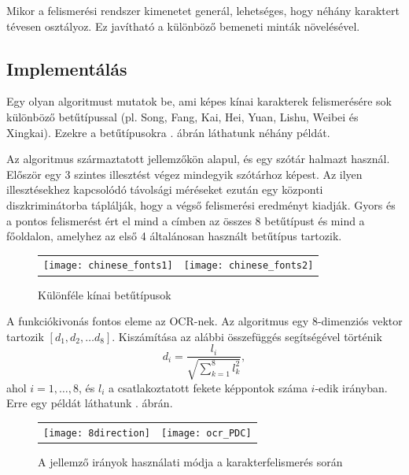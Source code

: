Mikor a felismerési rendszer kimenetet generál, lehetséges, hogy néhány karaktert tévesen osztályoz. Ez javítható a különböző bemeneti minták növelésével.

\subsection{Implementálás}

Egy olyan algoritmust mutatok be, ami képes kínai karakterek felismerésére sok különböző betűtípussal (pl. Song, Fang, Kai, Hei, Yuan, Lishu, Weibei és Xingkai). Ezekre a betűtípusokra . ábrán láthatunk néhány példát.

Az algoritmus származtatott jellemzőkön alapul, és egy szótár halmazt használ. Először egy 3 szintes illesztést végez mindegyik szótárhoz képest. Az ilyen illesztésekhez kapcsolódó távolsági méréseket ezután egy központi diszkriminátorba táplálják, hogy a végső felismerési eredményt kiadják. Gyors és a pontos felismerést ért el mind a címben az összes 8 betűtípust és mind a főoldalon, amelyhez az első 4 általánosan használt betűtípus tartozik.

\begin{figure}
\centering
\begin{tabular}{ c c }
\texttt{[image: chinese\_fonts1]} & \texttt{[image: chinese\_fonts2]}
\end{tabular}
\caption{Különféle kínai betűtípusok}
\label{fig:chinese_fonts}
\end{figure}

A funkciókivonás fontos eleme az OCR-nek. Az algoritmus egy 8-dimenziós vektor tartozik $[d_1, d_2, \ldots d_8]$. Kiszámítása az alábbi összefüggés segítségével történik
$$
d_i = \dfrac{l_i}{\sqrt{\displaystyle \sum_{k=1}^8 l_k^2}},
$$
ahol $i = 1, \ldots, 8$, és $l_i$ a csatlakoztatott fekete képpontok száma $i$-edik irányban. Erre egy példát láthatunk . ábrán.

\begin{figure}
\centering
\begin{tabular}{ c c }
\texttt{[image: 8direction]} & \texttt{[image: ocr\_PDC]}
\end{tabular}
\caption{A jellemző irányok használati módja a karakterfelismerés során}
\label{fig:8direction}
\end{figure}


